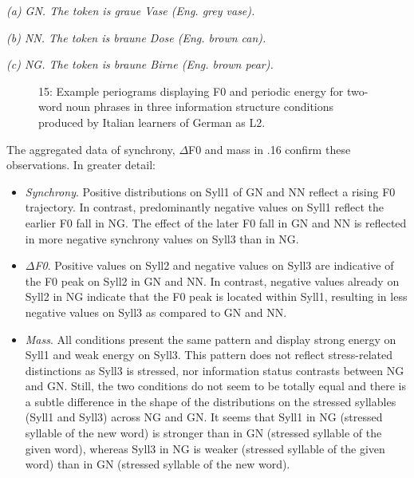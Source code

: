   
  \textit{(a) GN. The token is graue Vase (Eng. grey vase).}

  
  \textit{(b) NN. The token is braune Dose (Eng. brown can).}

  
 

\textit{(c) NG. The token is braune Birne (Eng. brown pear).}

\begin{stylecaption}\begin{figure}
\caption{15: Example periograms displaying F0 and periodic energy for two-word noun phrases in three information structure conditions produced by Italian learners of German as L2.}
\label{fig:key:2}
\end{figure}\end{stylecaption}

The aggregated data of synchrony, ${\Delta}$F0 and mass in .16 confirm these observations. In greater detail:

\begin{itemize}
\item \textit{Synchrony}. Positive distributions on Syll1 of GN and NN reflect a rising F0 trajectory. In contrast, predominantly negative values on Syll1 reflect the earlier F0 fall in NG. The effect of the later F0 fall in GN and NN is reflected in more negative synchrony values on Syll3 than in NG.
\item \textit{${\Delta}$F0}. Positive values on Syll2 and negative values on Syll3 are indicative of the F0 peak on Syll2 in GN and NN. In contrast, negative values already on Syll2 in NG indicate that the F0 peak is located within Syll1, resulting in less negative values on Syll3 as compared to GN and NN.
\item \textit{Mass}. All conditions present the same pattern and display strong energy on Syll1 and weak energy on Syll3. This pattern does not reflect stress-related distinctions as Syll3 is stressed, nor information status contrasts between NG and GN. Still, the two conditions do not seem to be totally equal and there is a subtle difference in the shape of the distributions on the stressed syllables (Syll1 and Syll3) across NG and GN. It seems that Syll1 in NG (stressed syllable of the new word) is stronger than in GN (stressed syllable of the given word), whereas Syll3 in NG is weaker (stressed syllable of the given word) than in GN (stressed syllable of the new word).
\end{itemize}
\begin{stylecaption}
  
 
\end{stylecaption}

